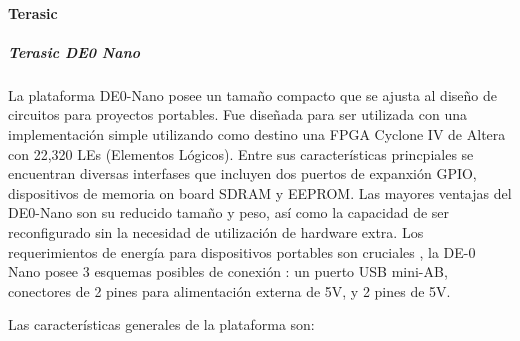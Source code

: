 				\paragraph{Terasic}
				\subparagraph{Terasic DE0 Nano}
				La plataforma DE0-Nano posee un tamaño compacto que se ajusta al diseño de circuitos para proyectos portables. Fue diseñada para ser
				utilizada con una implementación simple utilizando como destino una FPGA Cyclone IV de Altera con 22,320 LEs (Elementos Lógicos). Entre sus
				características princpiales se encuentran diversas interfases que incluyen dos puertos de expanxión GPIO, dispositivos de memoria on board SDRAM y
				EEPROM. Las mayores ventajas del DE0-Nano son su reducido tamaño y peso, así como la capacidad de ser reconfigurado sin la necesidad de
				utilización de hardware extra. Los requerimientos de energía para dispositivos portables son cruciales , la DE-0 Nano posee 3 esquemas posibles
				de conexión : un puerto USB mini-AB, conectores de 2 pines para alimentación externa de 5V, y 2 pines de 5V.

				Las características generales de la plataforma son:
				
